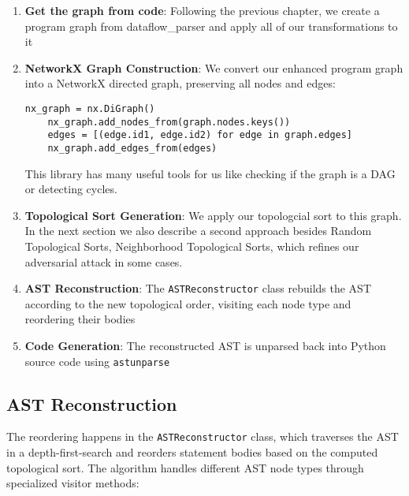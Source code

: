 \documentclass[%
thesis=student,%
coverpage=false,%
titlepage=false,%
headmarks=true, %
english,%
font=libertine, %
math=newpxtx, %
BCOR=5mm,%
coverBCOR=11mm%
]{tum-templates/book/tumbook}
\begin{document}
\begin{enumerate}
    \item \textbf{Get the graph from code}: Following the previous chapter, we create a program graph from dataflow\_parser and apply all of our transformations to it
    \item \textbf{NetworkX Graph Construction}: We convert our enhanced program graph into a NetworkX directed graph, preserving all nodes and edges:
    \begin{lstlisting}[style=pythonstyle, caption={Code snippet showing the conversion from our custom program graph representation to NetworkX format. This conversion enables the use of NetworkX's graph algorithms, particularly cycle detection and topological sorting, which are essential for identifying valid code reorderings.}]
    nx_graph = nx.DiGraph()
    nx_graph.add_nodes_from(graph.nodes.keys())
    edges = [(edge.id1, edge.id2) for edge in graph.edges]
    nx_graph.add_edges_from(edges)
    \end{lstlisting}
    This library has many useful tools for us like checking if the graph is a DAG or detecting cycles.

    \item \textbf{Topological Sort Generation}: We apply our topologcial sort to this graph. In the next section we also describe a second approach besides Random Topological Sorts, Neighborhood Topological Sorts, which refines our adversarial attack in some cases.

    \item \textbf{AST Reconstruction}: The \texttt{ASTReconstructor} class rebuilds the AST according to the new topological order, visiting each node type and reordering their bodies

    \item \textbf{Code Generation}: The reconstructed AST is unparsed back into Python source code using \texttt{astunparse}
\end{enumerate}

\subsection{AST Reconstruction}

The reordering happens in the \texttt{ASTReconstructor} class, which traverses the AST in a depth-first-search and reorders statement bodies based on the computed topological sort. The algorithm handles different AST node types through specialized visitor methods:
\end{document}
